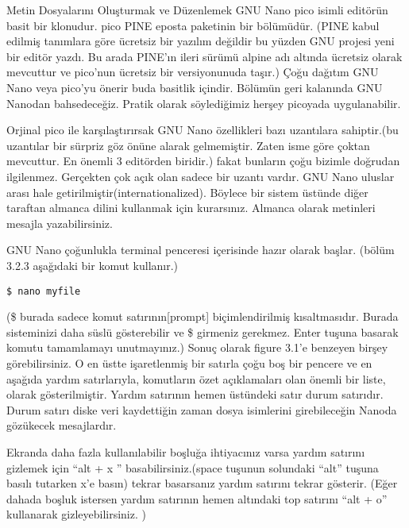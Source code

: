 \begin{section}{Metin Dosyalarını Oluşturmak ve Düzenlemek}
GNU Nano pico isimli editörün basit bir klonudur. pico PINE eposta paketinin bir bölümüdür. (PINE kabul edilmiş tanımlara göre ücretsiz bir yazılım değildir bu yüzden GNU projesi yeni bir editör yazdı. Bu arada PINE’ın ileri sürümü alpine adı altında ücretsiz olarak mevcuttur ve pico’nun ücretsiz bir versiyonunuda taşır.) Çoğu dağıtım GNU Nano veya pico’yu önerir buda basitlik içindir. Bölümün geri kalanında GNU Nanodan bahsedeceğiz. Pratik olarak söylediğimiz herşey picoyada uygulanabilir.

Orjinal pico ile karşılaştırırsak GNU Nano özellikleri bazı uzantılara sahiptir.(bu uzantılar bir sürpriz göz önüne alarak gelmemiştir. Zaten isme göre çoktan mevcuttur. En önemli 3 editörden biridir.) fakat bunların çoğu bizimle doğrudan ilgilenmez. Gerçekten çok açık olan sadece bir uzantı vardır. GNU Nano uluslar arası hale getirilmiştir(internationalized). Böylece bir sistem üstünde diğer taraftan almanca dilini kullanmak için kurarsınız.  Almanca olarak metinleri mesajla yazabilirsiniz.

GNU Nano çoğunlukla terminal penceresi içerisinde hazır olarak başlar. (bölüm 3.2.3 aşağıdaki bir komut kullanır.)

\begin{verbatim}
$ nano myfile
\end{verbatim}

(\$ burada sadece komut satırının[prompt] biçimlendirilmiş kısaltmasıdır. Burada sisteminizi daha süslü gösterebilir ve \$ girmeniz gerekmez. Enter tuşuna basarak komutu tamamlamayı unutmayınız.) Sonuç olarak figure 3.1’e benzeyen birşey görebilirsiniz. O en üstte işaretlenmiş bir satırla çoğu boş bir pencere ve en aşağıda yardım satırlarıyla, komutların özet açıklamaları olan önemli bir liste, olarak gösterilmiştir. Yardım satırının hemen üstündeki satır durum satırıdır. Durum satırı diske veri kaydettiğin zaman dosya isimlerini girebileceğin Nanoda gözükecek mesajlardır. 

Ekranda daha fazla kullanılabilir boşluğa ihtiyacınız varsa yardım satırını gizlemek için “alt + x ” basabilirsiniz.(space tuşunun solundaki “alt” tuşuna basılı tutarken x’e basın) tekrar basarsanız yardım satırını tekrar gösterir. (Eğer dahada boşluk istersen yardım satırının hemen altındaki top satırını “alt + o” kullanarak gizleyebilirsiniz. )


\end{section}
